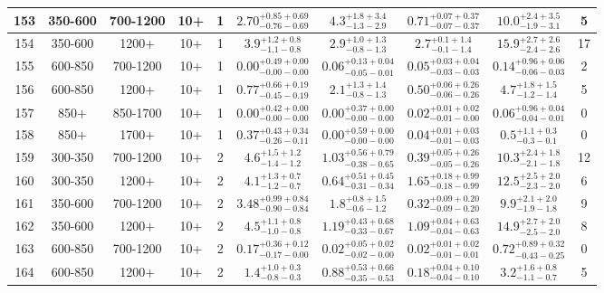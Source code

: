 \documentclass[11pt, oneside]{article}
\begin{document}
\begin{table}
{\begin{tabular}{ |c|c|c|c|c||c|c|c||c|c| }
153 & 350-600 & 700-1200 & 10+ & 1 & $2.70^{+0.85+0.69}_{-0.76-0.69}$ & $4.3^{+1.8+3.4}_{-1.3-2.9}$ & $0.71^{+0.07+0.37}_{-0.07-0.37}$ & $10.0^{+2.4+3.5}_{-1.9-3.1}$ & 5 \\ \hline
154 & 350-600 & 1200+ & 10+ & 1 & $3.9^{+1.2+0.8}_{-1.1-0.8}$ & $2.9^{+1.0+1.3}_{-0.8-1.3}$ & $2.7^{+0.1+1.4}_{-0.1-1.4}$ & $15.9^{+2.7+2.6}_{-2.4-2.6}$ & 17 \\ \hline
155 & 600-850 & 700-1200 & 10+ & 1 & $0.00^{+0.49+0.00}_{-0.00-0.00}$ & $0.06^{+0.13+0.04}_{-0.05-0.01}$ & $0.05^{+0.03+0.04}_{-0.03-0.03}$ & $0.14^{+0.96+0.06}_{-0.06-0.03}$ & 2 \\ \hline
156 & 600-850 & 1200+ & 10+ & 1 & $0.77^{+0.66+0.19}_{-0.45-0.19}$ & $2.1^{+1.3+1.4}_{-0.8-1.3}$ & $0.50^{+0.06+0.26}_{-0.06-0.26}$ & $4.7^{+1.8+1.5}_{-1.2-1.4}$ & 5 \\ \hline
157 & 850+ & 850-1700 & 10+ & 1 & $0.00^{+0.42+0.00}_{-0.00-0.00}$ & $0.00^{+0.37+0.00}_{-0.00-0.00}$ & $0.02^{+0.01+0.02}_{-0.01-0.00}$ & $0.06^{+0.96+0.04}_{-0.04-0.01}$ & 0 \\ \hline
158 & 850+ & 1700+ & 10+ & 1 & $0.37^{+0.43+0.34}_{-0.26-0.11}$ & $0.00^{+0.59+0.00}_{-0.00-0.00}$ & $0.04^{+0.01+0.03}_{-0.01-0.03}$ & $0.5^{+1.1+0.3}_{-0.3-0.1}$ & 0 \\ \hline
159 & 300-350 & 700-1200 & 10+ & 2 & $4.6^{+1.5+1.2}_{-1.4-1.2}$ & $1.03^{+0.56+0.79}_{-0.38-0.65}$ & $0.39^{+0.05+0.26}_{-0.05-0.26}$ & $10.3^{+2.4+1.8}_{-2.1-1.8}$ & 12 \\ \hline
160 & 300-350 & 1200+ & 10+ & 2 & $4.1^{+1.3+0.7}_{-1.2-0.7}$ & $0.64^{+0.51+0.45}_{-0.31-0.34}$ & $1.65^{+0.18+0.99}_{-0.18-0.99}$ & $12.5^{+2.5+2.0}_{-2.3-2.0}$ & 6 \\ \hline
161 & 350-600 & 700-1200 & 10+ & 2 & $3.48^{+0.99+0.84}_{-0.90-0.84}$ & $1.8^{+0.8+1.5}_{-0.6-1.2}$ & $0.32^{+0.09+0.20}_{-0.09-0.20}$ & $9.9^{+2.1+2.0}_{-1.9-1.8}$ & 9 \\ \hline
162 & 350-600 & 1200+ & 10+ & 2 & $4.5^{+1.1+0.8}_{-1.0-0.8}$ &  $1.19^{+0.43+0.68}_{-0.33-0.67}$ & $1.09^{+0.04+0.63}_{-0.04-0.63}$ & $14.9^{+2.7+2.0}_{-2.5-2.0}$ & 8 \\ \hline
163 & 600-850 & 700-1200 & 10+ & 2 & $0.17^{+0.36+0.12}_{-0.17-0.00}$ & $0.02^{+0.05+0.02}_{-0.02-0.00}$ & $0.02^{+0.01+0.02}_{-0.01-0.01}$ & $0.72^{+0.89+0.32}_{-0.43-0.25}$ & 0 \\ \hline
164 & 600-850 & 1200+ & 10+ & 2 & $1.4^{+1.0+0.3}_{-0.8-0.3}$ & $0.88^{+0.53+0.66}_{-0.35-0.53}$ & $0.18^{+0.04+0.10}_{-0.04-0.10}$ & $3.2^{+1.6+0.8}_{-1.1-0.7}$ & 5 \\ \hline

\end{tabular}}
\end{table}
\end{document}
